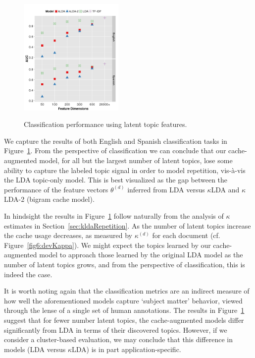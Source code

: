\begin{figure}
\begin{center}
{\includegraphics[width=0.45\textwidth]{graphs/ch6/topic-feats-auc.png}
}
\end{center}
\caption[Classification performance using latent topic features]{Classification performance using latent topic features. \label{fig6:topicFeats}}

\end{figure}

We capture the results of both English and Spanish classification tasks in Figure~\ref{fig6:topicFeats}.  From the perspective of classification we can conclude that our cache-augmented model, for all but the largest number of latent topics, lose some ability to capture the labeled topic signal in order to model repetition, vis-à-vis the LDA topic-only model.  This is best visualized as the gap between the performance of the feature vectors $\theta^{(d)}$ inferred from LDA versus $\kappa$LDA and $\kappa$LDA-2 (bigram cache model).

In hindsight the results in Figure~\ref{fig6:topicFeats} follow naturally from the analysis of $\kappa$ estimates in Section~\ref{sec:kldaRepetition}.  As the number of latent topics increase the cache usage decreases, as measured by $\kappa^{(d)}$ for each document (cf. Figure~\ref{fig6:devKappa}).  We might expect the topics learned by our cache-augmented model to approach those learned by the original LDA model as the number of latent topics grows, and from the perspective of classification, this is indeed the case.

It is worth noting again that the classification metrics are an indirect measure of how well the aforementioned models capture `subject matter' behavior, viewed through the lense of a single set of human annotations. The results in Figure~\ref{fig6:topicFeats} suggest that for fewer number latent topics, the cache-augmented models differ significantly from LDA in terms of their discovered topics.  However, if we consider a cluster-based evaluation, we may conclude that this difference in models (LDA versus $\kappa$LDA) is in part application-specific.

